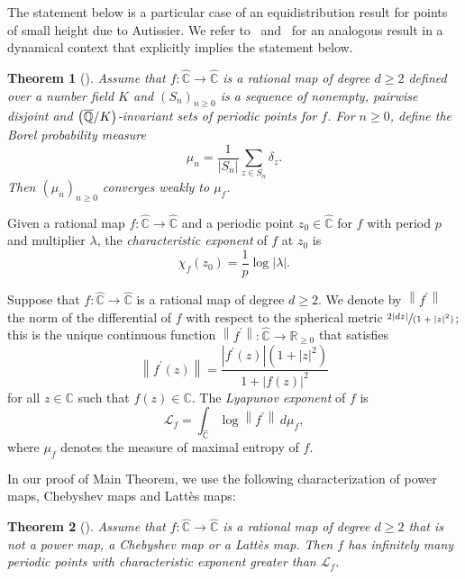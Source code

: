 \documentclass[11pt]{article}
\newcommand{\NoChangel}[1]{%
\expandafter\let\csname old\string#1\endcsname=#1
\let#1=\relax
\newcommand{#1}{\mathcode`l="716C\csname old\string#1\endcsname\mathcode`l="7160 }%
}
\newcommand{\spfrac}[2]{\sfrac{#1}{(#2)}}
\theoremstyle{plain}
\newtheorem{theorem}{Theorem}
\theoremstyle{definition}
\theoremstyle{remark}
\DeclareMathOperator{\Gal}{Gal}\NoChangel{\Gal}
\begin{document}
The statement below is a particular case of an equidistribution result for points of small height due to Autissier. We refer to~\cite[Th.\,10.24]{BR2010} and~\cite[Th.\,2 \& Th.\,4]{FRL2006} for an analogous result in a dynamical context that explicitly implies the statement below.

\begin{theorem}[{\cite[Prop.\,4.1.4]{A2001}}]
\label{theorem:equidistribution}
Assume that $f \colon \widehat{\mathbb{C}} \to \widehat{\mathbb{C}}$ is a rational map of degree $d \geq 2$ defined over a number field $K$ and $\left(S_{n} \right)_{n \geq 0}$ is a sequence of nonempty, pairwise disjoint and $\Gal\left(\overline{\mathbb{Q}}/K \right)$\nobreakdash-invariant sets of periodic points for $f$. For $n \geq 0$, define the Borel probability measure
\[
\mu_{n} = \frac{1}{\left\lvert S_{n} \right\rvert} \sum_{z \in S_{n}} \delta_{z}.
\]
Then $\left(\mu_{n} \right)_{n \geq 0}$ converges weakly to $\mu_{f}$.
\end{theorem}

Given a rational map $f \colon \widehat{\mathbb{C}} \to \widehat{\mathbb{C}}$ and a periodic point $z_{0} \in \widehat{\mathbb{C}}$ for $f$ with period $p$ and multiplier $\lambda$, the \emph{characteristic exponent} of $f$ at $z_{0}$ is
\[
\chi_{f}(z_{0}) = \frac{1}{p} \log\lvert \lambda \rvert.
\]

Suppose that $f \colon \widehat{\mathbb{C}} \to \widehat{\mathbb{C}}$ is a rational map of degree $d \geq 2$. We denote by $\left\lVert f^{\prime} \right\rVert$ the norm of the differential of $f$ with respect to the spherical metric $\spfrac{2 \lvert dz \rvert}{1 +\lvert z \rvert^{2}}$; this is the unique continuous function $\left\lVert f^{\prime} \right\rVert \colon \widehat{\mathbb{C}} \to \mathbb{R}_{\geq 0}$ that satisfies
\[
\left\lVert f^{\prime}(z) \right\rVert = \frac{\left\lvert f^{\prime}(z) \right\rvert \left(1 +\lvert z \rvert^{2} \right)}{1 +\left\lvert f(z) \right\rvert^{2}}
\]
for all $z \in \mathbb{C}$ such that $f(z) \in \mathbb{C}$. The \emph{Lyapunov exponent} of $f$ is
\[
\mathcal{L}_{f} = \int_{\widehat{\mathbb{C}}} \log\left\lVert f^{\prime} \right\rVert \, d\mu_{f},
\]
where $\mu_{f}$ denotes the measure of maximal entropy of $f$.

In our proof of Main Theorem, we use the following characterization of power maps, Chebyshev maps and Lattès maps:

\begin{theorem}[{\cite[Prop.\,4]{Z2014}}]
\label{theorem:exceptional}
Assume that $f \colon \widehat{\mathbb{C}} \to \widehat{\mathbb{C}}$ is a rational map of degree $d \geq 2$ that is not a power map, a Chebyshev map or a Lattès map. Then $f$ has infinitely many periodic points with characteristic exponent greater than $\mathcal{L}_{f}$.
\end{theorem}
\end{document}
